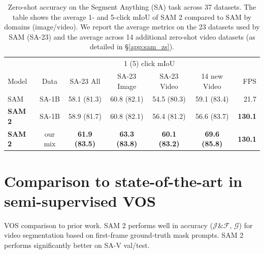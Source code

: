 \documentclass[]{fairmeta}
\newcommand{\mjf}{$\mathcal{J}\&\mathcal{F}$\xspace}
\newcommand{\mg}{$\mathcal{G}$}
\newcommand{\secref}[1]{\S\ref{#1}}
\begin{document}
\begin{table}[t]
\vspace{-10pt}
\centering
\small
\begin{tabular}{lcccccr}
&  &
  \multicolumn{4}{c}{1 (5) click mIoU} &
   \\
\cmidrule(lr){3-6}
\multicolumn{1}{l}{Model}  & \multicolumn{1}{c}{Data} &
  \multicolumn{1}{c}{SA-23 All} &
  \multicolumn{1}{c}{SA-23 Image} &
  \multicolumn{1}{c}{SA-23 Video} &
  \multicolumn{1}{c}{14 new Video} &
   \multicolumn{1}{r}{FPS}
  \\
\midrule
SAM & SA-1B & 
  58.1 (81.3) &
  60.8 (82.1) &
  54.5 (80.3) &
  59.1 (83.4) &
  21.7 \\
  
\textbf{SAM 2}  & SA-1B & 
  58.9 (81.7) &
  60.8 (82.1) &
  56.4 (81.2) &
  56.6 (83.7) &
  \textbf{130.1} \\ 
\textbf{SAM 2} & our mix & 
  \textbf{61.9 (83.5)} &
  \textbf{63.3 (83.8)} &
  \textbf{60.1 (83.2)} &
  \textbf{69.6 (85.8)} &
  \textbf{130.1} \\ 
  
\end{tabular}
\vspace{-5pt}
\caption{Zero-shot accuracy on the Segment Anything (SA) task across 37 datasets. The table shows the average 1- and 5-click mIoU of SAM 2 compared to SAM by domains (image/video). We report the average metrics on the 23 datasets used by SAM (SA-23) and the average across 14 additional zero-shot video datasets (as detailed in \secref{app:sam_zs}).}
\vspace{-5pt}
\label{tab:sam_zs_comparison}
\end{table}

\section{Comparison to state-of-the-art in semi-supervised VOS}
\label{sec:vos_sota}

\begin{table}[t]
    
    \vspace{-5pt}
    \caption{VOS comparison to prior work. SAM 2 performs well in accuracy (\mjf, \mg) for video segmentation based on first-frame ground-truth mask prompts. SAM 2 performs significantly better on SA-V val/test.
    }
    \label{tab:main-results}
    \vspace{-10pt}
\end{table}
\end{document}
